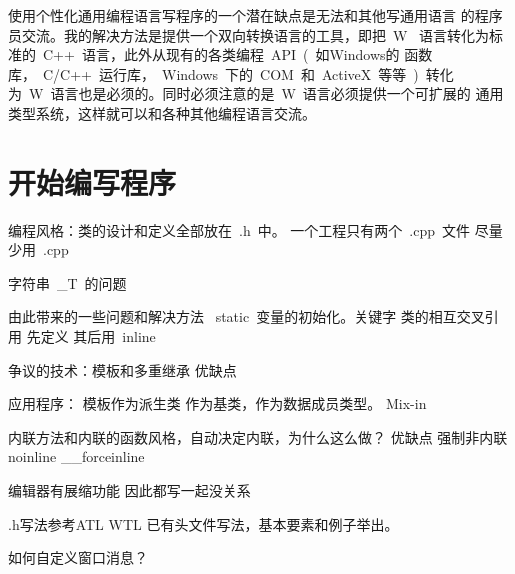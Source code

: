 使用个性化通用编程语言写程序的一个潜在缺点是无法和其他写通用语言
的程序员交流。我的解决方法是提供一个双向转换语言的工具，即把~W~
语言转化为标准的~C++~语言，此外从现有的各类编程~API~(~如Windows的
函数库，~C/C++~运行库，~Windows~下的~COM~和~ActiveX~等等~)~转化
为~W~语言也是必须的。同时必须注意的是~W~语言必须提供一个可扩展的
通用类型系统，这样就可以和各种其他编程语言交流。

\chapter{开始编写程序}

编程风格：类的设计和定义全部放在~.h~中。
一个工程只有两个~.cpp~文件 尽量少用~.cpp~

字符串~\_T~的问题

由此带来的一些问题和解决方法
~static~变量的初始化。关键字
类的相互交叉引用 先定义 其后用~inline~

争议的技术：模板和多重继承
优缺点

应用程序：
模板作为派生类 作为基类，作为数据成员类型。
Mix-in

内联方法和内联的函数风格，自动决定内联，为什么这么做？
优缺点 强制非内联 noinline
\_\_forceinline

编辑器有展缩功能 因此都写一起没关系

.h写法参考ATL WTL 已有头文件写法，基本要素和例子举出。

如何自定义窗口消息？
